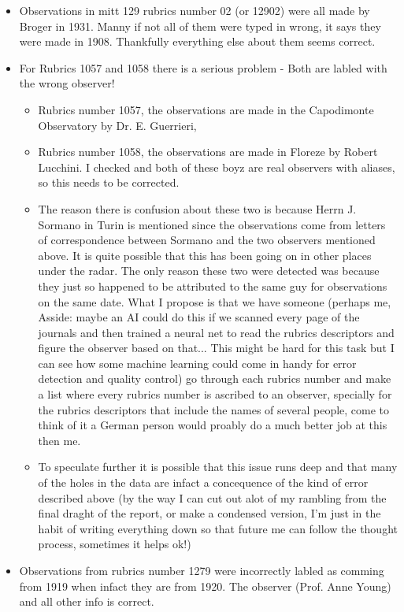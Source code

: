 \documentclass[12pt]{article}
\begin{document}
\begin{itemize}
\begin{itemize}
        \item Observations in mitt 129 rubrics number 02 (or 12902) were all made by Broger in 1931. Manny if not all of them were typed in wrong, it says they were made in 1908. Thankfully everything else about them seems correct.
        \item For Rubrics 1057 and 1058 there is a serious problem - Both are labled with the wrong observer! 
        \begin{itemize}
            \item Rubrics number 1057, the observations are made in the Capodimonte Observatory by Dr. E. Guerrieri,
            \item Rubrics number 1058, the observations are made in Floreze by Robert Lucchini. I checked and both of these boyz are real observers with aliases, so this needs to be corrected.
            \item The reason there is confusion about these two is because Herrn J. Sormano in Turin is mentioned since the observations come from letters of correspondence between Sormano and the two observers mentioned above. It is quite possible that this has been going on in other places under the radar. The only reason these two were detected was because they just so happened to be attributed to the same guy for observations on the same date. What I propose is that we have someone (perhaps me, Asside: maybe an AI could do this if we scanned every page of the journals and then trained a neural net to read the rubrics descriptors and figure the observer based on that... This might be hard for this task but I can see how some machine learning could come in handy for error detection and quality control) go through each rubrics number and make a list where every rubrics number is ascribed to an observer, specially for the rubrics descriptors that include the names of several people, come to think of it a German person would proably do a much better job at this then me.
            \item To speculate further it is possible that this issue runs deep and that many of the holes in the data are infact a concequence of the kind of error described above (by the way I can cut out alot of my rambling from the final draght of the report, or make a condensed version, I'm just in the habit of writing everything down so that future me can follow the thought process, sometimes it helps ok!)
    \end{itemize}
    \item Observations from rubrics number 1279 were incorrectly labled as comming from 1919 when infact they are from 1920. The observer (Prof. Anne Young) and all other info is correct.

\end{itemize}
\end{itemize}
\end{document}
